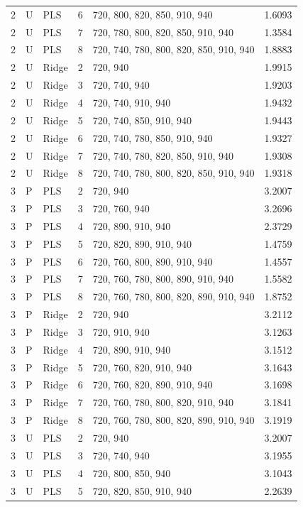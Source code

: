 \documentclass[10pt,a4paper]{article}
\begin{document}
\begin{landscape}
\begin{longtable}{rllrlr}
2 & U & PLS & 6 & 720, 800, 820, 850, 910, 940 & 1.6093 \\
2 & U & PLS & 7 & 720, 780, 800, 820, 850, 910, 940 & 1.3584 \\
2 & U & PLS & 8 & 720, 740, 780, 800, 820, 850, 910, 940 & 1.8883 \\
2 & U & Ridge & 2 & 720, 940 & 1.9915 \\
2 & U & Ridge & 3 & 720, 740, 940 & 1.9203 \\
2 & U & Ridge & 4 & 720, 740, 910, 940 & 1.9432 \\
2 & U & Ridge & 5 & 720, 740, 850, 910, 940 & 1.9443 \\
2 & U & Ridge & 6 & 720, 740, 780, 850, 910, 940 & 1.9327 \\
2 & U & Ridge & 7 & 720, 740, 780, 820, 850, 910, 940 & 1.9308 \\
2 & U & Ridge & 8 & 720, 740, 780, 800, 820, 850, 910, 940 & 1.9318 \\
3 & P & PLS & 2 & 720, 940 & 3.2007 \\
3 & P & PLS & 3 & 720, 760, 940 & 3.2696 \\
3 & P & PLS & 4 & 720, 890, 910, 940 & 2.3729 \\
3 & P & PLS & 5 & 720, 820, 890, 910, 940 & 1.4759 \\
3 & P & PLS & 6 & 720, 760, 800, 890, 910, 940 & 1.4557 \\
3 & P & PLS & 7 & 720, 760, 780, 800, 890, 910, 940 & 1.5582 \\
3 & P & PLS & 8 & 720, 760, 780, 800, 820, 890, 910, 940 & 1.8752 \\
3 & P & Ridge & 2 & 720, 940 & 3.2112 \\
3 & P & Ridge & 3 & 720, 910, 940 & 3.1263 \\
3 & P & Ridge & 4 & 720, 890, 910, 940 & 3.1512 \\
3 & P & Ridge & 5 & 720, 760, 820, 910, 940 & 3.1643 \\
3 & P & Ridge & 6 & 720, 760, 820, 890, 910, 940 & 3.1698 \\
3 & P & Ridge & 7 & 720, 760, 780, 800, 820, 910, 940 & 3.1841 \\
3 & P & Ridge & 8 & 720, 760, 780, 800, 820, 890, 910, 940 & 3.1919 \\
3 & U & PLS & 2 & 720, 940 & 3.2007 \\
3 & U & PLS & 3 & 720, 740, 940 & 3.1955 \\
3 & U & PLS & 4 & 720, 800, 850, 940 & 3.1043 \\
3 & U & PLS & 5 & 720, 820, 850, 910, 940 & 2.2639 \\

\end{longtable}
\end{landscape}
\end{document}
